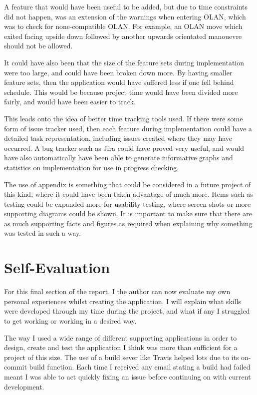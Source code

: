 A feature that would have been useful to be added, but due to time constraints did not happen, was an extension of the warnings when entering OLAN, which was to check for none-compatible OLAN. For example, an OLAN move which exited facing upside down followed by another upwards orientated manouevre should not be allowed. 


It could have also been that the size of the feature sets during implementation were too large, and could have been broken down more. By having smaller feature sets, then the application would have suffered less if one fell behind schedule. This would be because project time would have been divided more fairly, and would have been easier to track.

This leads onto the idea of better time tracking tools used. If there were some form of issue tracker used, then each feature during implementation could have a detailed task representation, including issues created where they may have occurred. A bug tracker such as Jira could have proved very useful, and would have also automatically have been able to generate informative graphs and statistics on implementation for use in progress checking.

The use of appendix is something that could be considered in a future project of this kind, where it could have been taken advantage of much more. Items such as testing could be expanded more for usability testing, where screen shots or more supporting diagrams could be shown. It is important to make sure that there are as much supporting facts and figures as required when explaining why something was tested in such a way.

\section{Self-Evaluation}
For this final section of the report, I the author can now evaluate my own personal experiences whilst creating the application. I will explain what skills were developed through my time during the project, and what if any I struggled to get working or working in a desired way.

The way I used a wide range of different supporting applications in order to design, create and test the application I think was more than sufficient for a project of this size. The use of a build sever like Travis helped lots due to its on-commit build function. Each time I received any email stating a build had failed meant I was able to act quickly fixing an issue before continuing on with current development.

